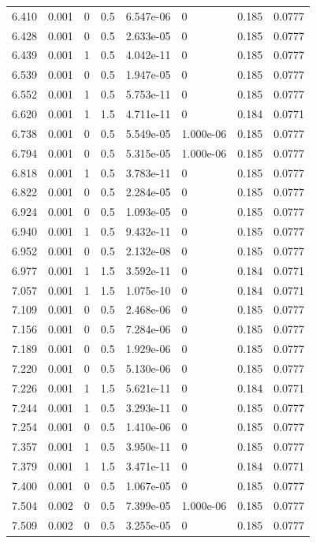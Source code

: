 \documentclass[preview]{standalone}
\begin{document}
{{{\begin{tabular}{L{1.2cm}C{1.2cm} C{0.3cm}C{0.5cm} C{1.4cm}C{1.4cm} C{1.4cm}C{1.4cm}}
  6.410  &  0.001  & 0     & 0.5 &  6.547e-06  & 0  & 0.185 &  0.0777   \\ 
  6.428  &  0.001  & 0     & 0.5 &  2.633e-05  & 0  & 0.185 &  0.0777   \\ 
  6.439  &  0.001  & 1     & 0.5 &  4.042e-11  & 0  & 0.185 &  0.0777   \\ 
  6.539  &  0.001  & 0     & 0.5 &  1.947e-05  & 0  & 0.185 &  0.0777   \\ 
  6.552  &  0.001  & 1     & 0.5 &  5.753e-11  & 0  & 0.185 &  0.0777   \\ 
  6.620  &  0.001  & 1     & 1.5 &  4.711e-11  & 0  & 0.184 &  0.0771   \\ 
  6.738  &  0.001  & 0     & 0.5 &  5.549e-05  & 1.000e-06  & 0.185 &  0.0777   \\ 
  6.794  &  0.001  & 0     & 0.5 &  5.315e-05  & 1.000e-06  & 0.185 &  0.0777   \\ 
  6.818  &  0.001  & 1     & 0.5 &  3.783e-11  & 0  & 0.185 &  0.0777   \\ 
  6.822  &  0.001  & 0     & 0.5 &  2.284e-05  & 0  & 0.185 &  0.0777   \\ 
  6.924  &  0.001  & 0     & 0.5 &  1.093e-05  & 0  & 0.185 &  0.0777   \\ 
  6.940  &  0.001  & 1     & 0.5 &  9.432e-11  & 0  & 0.185 &  0.0777   \\ 
  6.952  &  0.001  & 0     & 0.5 &  2.132e-08  & 0  & 0.185 &  0.0777   \\ 
  6.977  &  0.001  & 1     & 1.5 &  3.592e-11  & 0  & 0.184 &  0.0771   \\ 
  7.057  &  0.001  & 1     & 1.5 &  1.075e-10  & 0  & 0.184 &  0.0771   \\ 
  7.109  &  0.001  & 0     & 0.5 &  2.468e-06  & 0  & 0.185 &  0.0777   \\ 
  7.156  &  0.001  & 0     & 0.5 &  7.284e-06  & 0  & 0.185 &  0.0777   \\ 
  7.189  &  0.001  & 0     & 0.5 &  1.929e-06  & 0  & 0.185 &  0.0777   \\ 
  7.220  &  0.001  & 0     & 0.5 &  5.130e-06  & 0  & 0.185 &  0.0777   \\ 
  7.226  &  0.001  & 1     & 1.5 &  5.621e-11  & 0  & 0.184 &  0.0771   \\ 
  7.244  &  0.001  & 1     & 0.5 &  3.293e-11  & 0  & 0.185 &  0.0777   \\ 
  7.254  &  0.001  & 0     & 0.5 &  1.410e-06  & 0  & 0.185 &  0.0777   \\ 
  7.357  &  0.001  & 1     & 0.5 &  3.950e-11  & 0  & 0.185 &  0.0777   \\ 
  7.379  &  0.001  & 1     & 1.5 &  3.471e-11  & 0  & 0.184 &  0.0771   \\ 
  7.400  &  0.001  & 0     & 0.5 &  1.067e-05  & 0  & 0.185 &  0.0777   \\ 
  7.504  &  0.002  & 0     & 0.5 &  7.399e-05  & 1.000e-06  & 0.185 &  0.0777   \\ 
  7.509  &  0.002  & 0     & 0.5 &  3.255e-05  & 0  & 0.185 &  0.0777   \\ 
\hline 
\end{tabular} 

}}}
\end{document}
